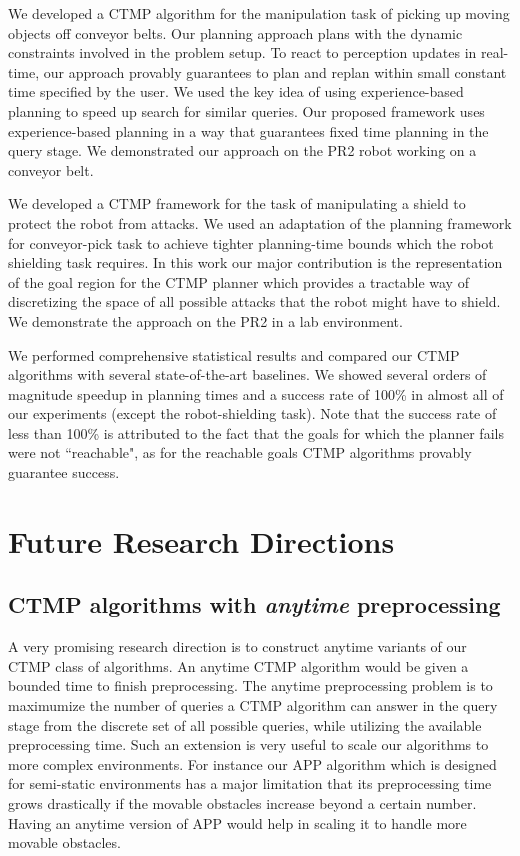 \documentclass[a4paper]{report}
\begin{document}
We developed a CTMP algorithm for the manipulation task of picking up moving objects off conveyor belts. Our planning approach plans with the dynamic constraints involved in the problem setup. To react to perception updates in real-time, our approach provably guarantees to plan and replan within small constant time specified by the user. We used the key idea of using experience-based planning to speed up search for similar queries. Our proposed framework uses experience-based planning in a way that guarantees fixed time planning in the query stage. We demonstrated our approach on the PR2 robot working on a conveyor belt.

We developed a CTMP framework for the task of manipulating a shield to protect the robot from attacks. We used an adaptation of the planning framework for conveyor-pick task to achieve tighter planning-time bounds which the robot shielding task requires. In this work our major contribution is the representation of the goal region for the CTMP planner which provides a tractable way of discretizing the space of all possible attacks that the robot might have to shield. We demonstrate the approach on the PR2 in a lab environment.

We performed comprehensive statistical results and compared our CTMP algorithms with several state-of-the-art baselines. We showed several orders of magnitude speedup in planning times and a success rate of 100\% in almost all of our experiments (except the robot-shielding task). Note that the success rate of less than 100\% is attributed to the fact that the goals for which the planner fails were not ``reachable", as for the reachable goals CTMP algorithms provably guarantee success.

\newpage

\section{Future Research Directions}

\subsection{CTMP algorithms with \emph{anytime} preprocessing}
A very promising research direction is to construct anytime variants of our CTMP class of algorithms. An anytime CTMP algorithm would be given a bounded time to finish preprocessing. The anytime preprocessing problem is to maximumize the number of queries a CTMP algorithm can answer in the query stage from the discrete set of all possible queries, while utilizing the available preprocessing time. Such an extension is very useful to scale our algorithms to more complex environments. For instance our APP algorithm which is designed for semi-static environments has a major limitation that its preprocessing time grows drastically if the movable obstacles increase beyond a certain number. Having an anytime version of APP would help in scaling it to handle more movable obstacles.
\end{document}
